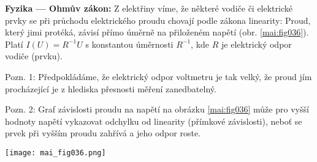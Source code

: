 \wikitextrule
\begin{example}\label{mai:exam035}
  \textbf{Fyzika — Ohmův zákon:}\newline\small
  Z elektřiny víme, že některé vodiče či elektrické prvky se při průchodu elektrického proudu 
  chovají podle zákona linearity: Proud, který jimi protéká, závisí přímo úměrně na přiloženém 
  napětí (obr. \ref{mai:fig036}). Platí \(I(U) = R^{-1 }U\) s konstantou úměrnosti \(R^{-1}\), kde 
  \(R\) je elektrický odpor vodiče (prvku).

  Pozn. 1: Předpokládáme, že elektrický odpor voltmetru je tak velký, že proud jím procházející je 
  z hlediska přesnosti měření zanedbatelný.
  
  Pozn. 2: Graf závislosti proudu na napětí na obrázku \ref{mai:fig036} může pro vyšší hodnoty 
  napětí vykazovat odchylku od linearity (přímkové závislosti), neboť se prvek při vyšším proudu 
  zahřívá a jeho odpor roste.
  
  {\centering
    \captionsetup{type=figure}
    \texttt{[image: mai\_fig036.png]}
    \label{mai:fig036}
    \par}  
  \normalsize
\end{example}